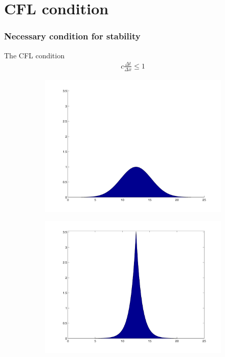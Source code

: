 \documentclass{beamer}
\begin{document}
\section*{CFL condition}
\begin{frame}
\frametitle{Necessary condition for stability}
The CFL condition
\begin{align*}
c \frac{\Delta t}{\Delta x} \leq 1
\end{align*}

\begin{figure}
\begin{subfigure}[b]{0.49\textwidth}
                \includegraphics[width=\textwidth]{gfx/areainitial}
\end{subfigure}
\begin{subfigure}[b]{0.49\textwidth}
                \includegraphics[width=\textwidth]{gfx/areapeakon}
\end{subfigure}
\end{figure}

\end{frame}
\end{document}
